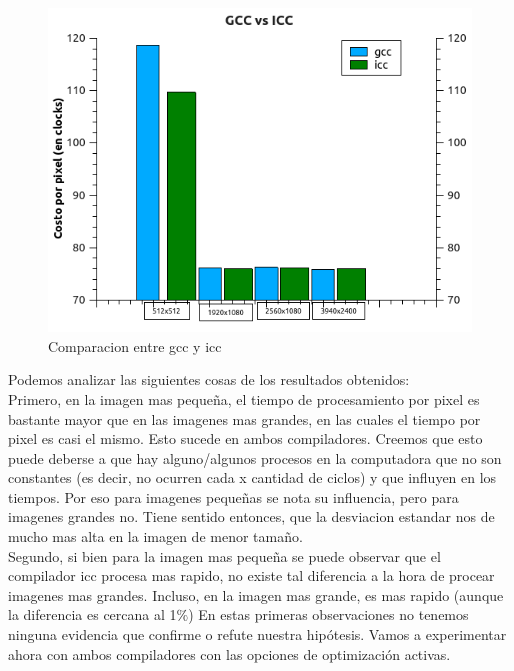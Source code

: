 \begin{figure}[H]
\begin{center}
  \includegraphics[width=\linewidth]{tiemposCompiladores/gccVsIcc.png}
  \caption{{\small Comparacion entre gcc y icc}} 
\endminipage
\end{center}
\end{figure}

Podemos analizar las siguientes cosas de los resultados obtenidos: \\
Primero, en la imagen mas pequeña, el tiempo de procesamiento por pixel es bastante mayor que en las imagenes mas grandes, en las cuales el tiempo por pixel es casi el mismo. Esto sucede en ambos compiladores. Creemos que esto puede deberse a que hay alguno/algunos procesos en la computadora que no son constantes (es decir, no ocurren cada x cantidad de ciclos) y que influyen en los tiempos. Por eso para imagenes pequeñas se nota su influencia, pero para imagenes grandes no. Tiene sentido entonces, que la desviacion estandar nos de mucho mas alta en la imagen de menor tamaño.\\
Segundo, si bien para la imagen mas pequeña se puede observar que el compilador icc procesa mas rapido, no existe tal diferencia a la hora de procear imagenes mas grandes. Incluso, en la imagen mas grande, es mas rapido (aunque la diferencia es cercana al 1$\%$)
En estas primeras observaciones no tenemos ninguna evidencia que confirme o refute nuestra hipótesis. Vamos a experimentar ahora con ambos compiladores con las opciones de optimización activas.

